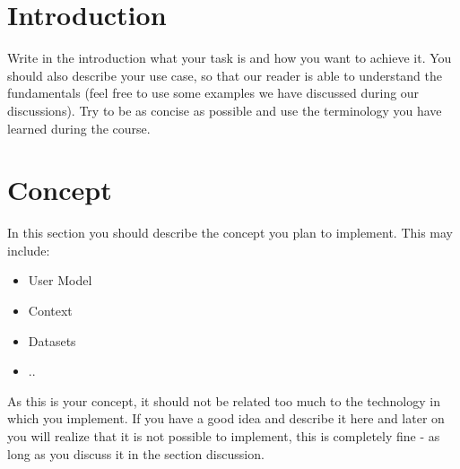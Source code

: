 \documentclass[fleqn,10pt]{SelfArx} %
\affiliation{\textsuperscript{1}\textit{Nuremberg Institute of Technology, Faculty of Electrical Engineering, Precision Engineering, Information Technology, Germany}} %
\begin{document}
\maketitle %

\thispagestyle{empty} %


\section*{Introduction} %

Write in the introduction what your task is and how you want to achieve it. You should also describe your use case, so that our reader is able to understand the fundamentals (feel free to use some examples we have discussed during our discussions). Try to be as concise as possible and use the terminology you have learned during the course. 

\section*{Concept}

In this section you should describe the concept you plan to implement. This may include: 

\begin{itemize}[noitemsep] %
	\item User Model
	\item Context
	\item Datasets
	\item ..
\end{itemize}

\noindent As this is your concept, it should not be related too much to the technology in which you implement. If you have a good idea and describe it here and later on you will realize that it is not possible to implement, this is completely fine - as long as you discuss it in the section discussion. 
\end{document}
